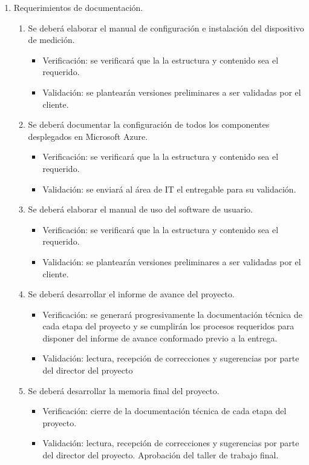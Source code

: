 \documentclass[
11pt, %
]{charter}
\begin{document}
\begin{enumerate}
	\item Requerimientos de documentación.
		\begin{enumerate}
			\item Se deberá elaborar el manual de configuración e instalación del dispositivo de medición.
			\begin{itemize}
				\item Verificación: se verificará que la la estructura y contenido sea el requerido. 
				\item Validación: se plantearán versiones preliminares a ser validadas por el cliente.
			\end{itemize}			
			\item Se deberá documentar la configuración de todos los componentes desplegados en Microsoft Azure.
			\begin{itemize}
				\item Verificación: se verificará que la la estructura y contenido sea el requerido. 
				\item Validación: se enviará al área de IT el entregable para su validación.
			\end{itemize}
			\item Se deberá elaborar el manual de uso del software de usuario.
			\begin{itemize}
				\item Verificación: se verificará que la la estructura y contenido sea el requerido.
				\item Validación: se plantearán versiones preliminares a ser validadas por el cliente.
			\end{itemize}
			\item Se deberá desarrollar el informe de avance del proyecto.
			\begin{itemize}
				\item Verificación: se generará progresivamente la documentación técnica de cada etapa del proyecto y se cumplirán los procesos requeridos para disponer del informe de avance conformado previo a la entrega.
				\item Validación: lectura, recepción de correcciones y sugerencias por parte del director del proyecto
			\end{itemize}
			\item Se deberá desarrollar la memoria final del proyecto.
			\begin{itemize}
				\item Verificación: cierre de la documentación técnica de cada etapa del proyecto. 
				\item Validación: lectura, recepción de correcciones y sugerencias por parte del director del proyecto. Aprobación del taller de trabajo final.
			\end{itemize}
		\end{enumerate}
		
	\end{enumerate}
\end{document}
